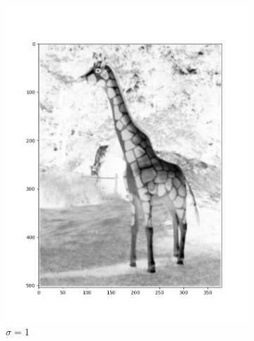 \documentclass[12pt, oneside]{article}
\begin{document}
\begin{figure}[H]
\begin{subfigure}[b]{0.3\textwidth}
        \includegraphics[width=\textwidth]{imgs/q1_plot1.png}
        \caption{$\sigma = 1$}
        \label{fig:three sin x}
    \end{subfigure}
    \hfill
    \begin{subfigure}[b]{0.3\textwidth}
        \centering

\end{subfigure}
\end{figure}
\end{document}

